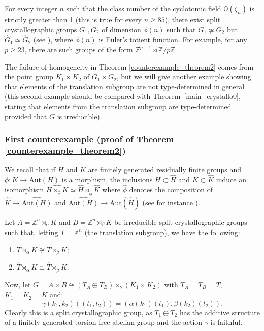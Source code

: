 \documentclass[a4paper, 11pt]{amsart}
\theoremstyle{definition}
\theoremstyle{remark}
\renewcommand{\geq}{\geqslant}
\begin{document}
For every integer $n$ such that the class number of the cyclotomic field $\mathbb{Q}(\zeta_n)$ is strictly greater than 1 (this is true for every $n\geq 85$), there exist split crystallographic groups $G_1,G_2$ of dimension $\phi(n)$ such that $G_1\not\simeq G_2$ but $\widehat{G}_1\simeq \widehat{G}_2$ (see \cite{bri}), where $\phi(n)$ is Euler's totient function. For example, for any $p\geq 23$, there are such groups of the form $\mathbb{Z}^{p-1} \rtimes\mathbb{Z}/p\mathbb{Z}$.

The failure of homogeneity in Theorem \ref{counterexample_theorem2} comes from the point group $K_1\times K_2$ of $G_1 \times G_2$, but we will give another example showing that elements of the translation subgroup are not type-determined in general (this second example should be compared with Theorem~\ref{main_crystallo0}, stating that elements from the translation subgroup are type-determined provided that $G$ is irreducible).

\subsubsection{First counterexample (proof of Theorem \ref{counterexample_theorem2})}\label{count_sec}


We recall that if $H$ and $K$ are finitely generated residually finite groups and $\phi : K\rightarrow \mathrm{Aut}(H)$ is a morphism, the inclusions $H\subset \widehat{H}$ and $K\subset \widehat{K}$ induce an isomorphism $\widehat{H\rtimes_{\phi}K}\simeq \widehat{H}\rtimes_{\widehat{\phi}}\widehat{K}$ where $\widehat{\phi}$ denotes the composition of $\widehat{K}\rightarrow\widehat{\mathrm{Aut}(H)}$ and $\widehat{\mathrm{Aut}(H)}\rightarrow\mathrm{Aut}(\widehat{H})$ (see for instance \cite[Proposition~2.6]{GZ11}).

\smallskip \noindent
Let $A = \mathbb{Z}^n \rtimes_\alpha K$ and $B = \mathbb{Z}^n \rtimes_\beta K$ be irreducible split crystallographic groups such that, letting $T = \mathbb{Z}^n$ (the translation subgroup), we have the following:
\begin{enumerate}[(1)]
	\item $T \rtimes_\alpha K \not\cong T \rtimes_\beta K$;
	\item $\widehat{T} \rtimes_\alpha K \cong \widehat{T} \rtimes_\beta K$.
	\end{enumerate}
Now, let $G = A \times B \cong (T_A \oplus T_B) \rtimes_\gamma (K_1 \times K_2)$ with $T_A = T_B = T$, $K_1 = K_2 = K$
 and:
$$\gamma(k_1, k_2)((t_1, t_2)) = (\alpha(k_1)(t_1), \beta(k_2)(t_2)).$$
Clearly this is a split crystallographic group, as $T_1 \oplus T_2$ has the additive structure of a finitely generated torsion-free abelian group and the action $\gamma$ is faithful. 
\end{document}
